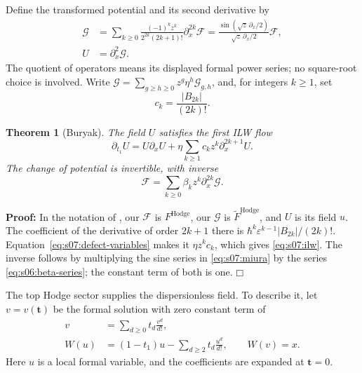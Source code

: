 \documentclass[a4paper,10pt]{article}
\numberwithin{equation}{section}
\theoremstyle{paperplain}
\newtheorem{thm}{Theorem}[section]
\theoremstyle{paperremark}
\theoremstyle{paperplain}
\newenvironment{prf}{\noindent \textbf{Proof: }}{\hfill $\mdlgwhtsquare$\par\addvspace{0.5\baselineskip}}
\begin{document}
Define the transformed potential and its second derivative by
\begin{equation}\label{eq:s07:miura}
 \begin{aligned}
 \mathcal G
 &=\sum_{k\geq0}\frac{(-1)^kz^k}{2^{2k}(2k+1)!}
                         \partial_x^{2k}\mathcal F
 =\frac{\sin(\sqrt z\,\partial_x/2)}{\sqrt z\,\partial_x/2}
                         \mathcal F,\\
 U&=\partial_x^2\mathcal G.
 \end{aligned}
\end{equation}
The quotient of operators means its displayed formal power series;
no square-root choice is involved. Write
$\mathcal G=\sum_{g\geq h\geq0}z^g\eta^h\mathcal G_{g,h}$, and, for
integers $k\geq1$, set
\begin{equation}\label{eq:s07:ilw-coefficients}
 c_k=\frac{|B_{2k}|}{(2k)!}.
\end{equation}

\begin{thm}[Buryak]\label{thm:s07:ilw}
The field $U$ satisfies the first ILW flow
\begin{equation}\label{eq:s07:ilw}
 \partial_{t_1}U=U\partial_xU
        +\eta\sum_{k\geq1}c_k z^k\partial_x^{2k+1}U.
\end{equation}
The change of potential is invertible, with inverse
\begin{equation}\label{eq:s07:inverse-miura}
 \mathcal F=\sum_{k\geq0}\beta_k z^k\partial_x^{2k}\mathcal G.
\end{equation}
\end{thm}
\begin{prf}
In the notation of \cite[Theorem~1.1 and (1.1)--(1.2)]{Bur15}, our
$\mathcal F$ is $F^{\mathrm{Hodge}}$, our $\mathcal G$ is
$\widetilde F^{\mathrm{Hodge}}$, and $U$ is its field $u$.
The coefficient of the derivative of order $2k+1$ there is
$\hbar^k\varepsilon^{k-1}|B_{2k}|/(2k)!$.
Equation~\eqref{eq:s07:defect-variables} makes it $\eta z^k c_k$,
which gives \eqref{eq:s07:ilw}. The inverse follows by multiplying the
sine series in \eqref{eq:s07:miura} by the series
\eqref{eq:s06:beta-series}; the constant term of both is one.
\end{prf}

The top Hodge sector supplies the dispersionless field. To describe
it, let $v=v(\mathbf t)$ be the formal solution with zero constant
term of
\begin{equation}\label{eq:s07:genus-zero-inverse}
 \begin{aligned}
 v&=\sum_{d\geq0}t_d\frac{v^d}{d!},\\
 W(u)&=(1-t_1)u-\sum_{d\geq2}t_d\frac{u^d}{d!},\qquad W(v)=x.
 \end{aligned}
\end{equation}
Here $u$ is a local formal variable, and the coefficients are expanded
at $\mathbf t=0$.
\end{document}
